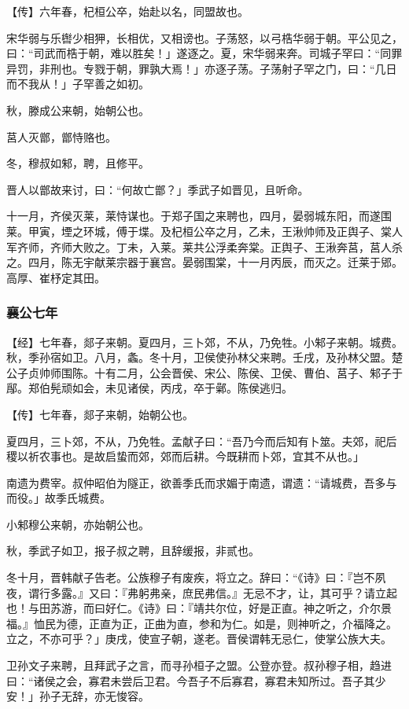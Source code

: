 \documentclass[]{article}
\begin{document}
【传】六年春，杞桓公卒，始赴以名，同盟故也。

宋华弱与乐辔少相狎，长相优，又相谤也。子荡怒，以弓梏华弱于朝。平公见之，曰：``司武而梏于朝，难以胜矣！」遂逐之。夏，宋华弱来奔。司城子罕曰：``同罪异罚，非刑也。专戮于朝，罪孰大焉！」亦逐子荡。子荡射子罕之门，曰：``几日而不我从！」子罕善之如初。

秋，滕成公来朝，始朝公也。

莒人灭鄫，鄫恃赂也。

冬，穆叔如邾，聘，且修平。

晋人以鄫故来讨，曰：``何故亡鄫？」季武子如晋见，且听命。

十一月，齐侯灭莱，莱恃谋也。于郑子国之来聘也，四月，晏弱城东阳，而遂围莱。甲寅，堙之环城，傅于堞。及杞桓公卒之月，乙未，王湫帅师及正舆子、棠人军齐师，齐师大败之。丁未，入莱。莱共公浮柔奔棠。正舆子、王湫奔莒，莒人杀之。四月，陈无宇献莱宗器于襄宫。晏弱围棠，十一月丙辰，而灭之。迁莱于郳。高厚、崔杼定其田。

\hypertarget{header-n1886}{%
\subsubsection{襄公七年}\label{header-n1886}}

【经】七年春，郯子来朝。夏四月，三卜郊，不从，乃免牲。小邾子来朝。城费。秋，季孙宿如卫。八月，螽。冬十月，卫侯使孙林父来聘。壬戌，及孙林父盟。楚公子贞帅师围陈。十有二月，公会晋侯、宋公、陈侯、卫侯、曹伯、莒子、邾子于鄬。郑伯髡顽如会，未见诸侯，丙戌，卒于鄵。陈侯逃归。

【传】七年春，郯子来朝，始朝公也。

夏四月，三卜郊，不从，乃免牲。孟献子曰：``吾乃今而后知有卜筮。夫郊，祀后稷以祈农事也。是故启蛰而郊，郊而后耕。今既耕而卜郊，宜其不从也。」

南遗为费宰。叔仲昭伯为隧正，欲善季氏而求媚于南遗，谓遗：``请城费，吾多与而役。」故季氏城费。

小邾穆公来朝，亦始朝公也。

秋，季武子如卫，报子叔之聘，且辞缓报，非贰也。

冬十月，晋韩献子告老。公族穆子有废疾，将立之。辞曰：``《诗》曰：『岂不夙夜，谓行多露。』又曰：『弗躬弗亲，庶民弗信。』无忌不才，让，其可乎？请立起也！与田苏游，而曰好仁。《诗》曰：『靖共尔位，好是正直。神之听之，介尔景福。』恤民为德，正直为正，正曲为直，参和为仁。如是，则神听之，介福降之。立之，不亦可乎？」庚戌，使宣子朝，遂老。晋侯谓韩无忌仁，使掌公族大夫。

卫孙文子来聘，且拜武子之言，而寻孙桓子之盟。公登亦登。叔孙穆子相，趋进曰：``诸侯之会，寡君未尝后卫君。今吾子不后寡君，寡君未知所过。吾子其少安！」孙子无辞，亦无悛容。
\end{document}
